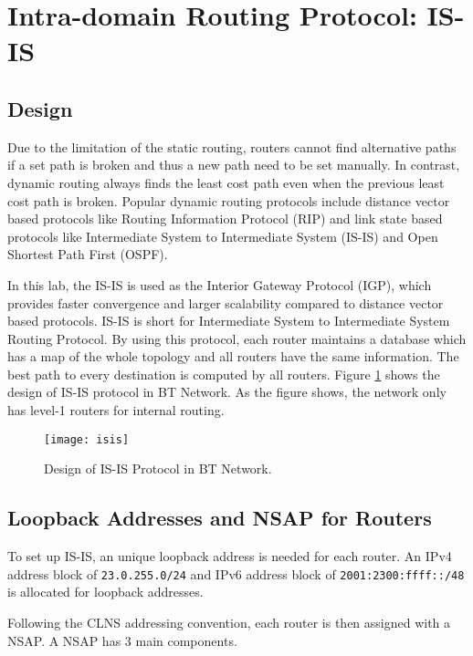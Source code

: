 \section{Intra-domain Routing Protocol: IS-IS}
\label{sec:isis}

\subsection{Design}

Due to the limitation of the static routing, routers cannot find alternative paths if a set path is broken and thus a new path need to be set manually. 
In contrast, dynamic routing always finds the least cost path even when the previous least cost path is broken.
Popular dynamic routing protocols include distance vector based protocols like Routing Information Protocol (RIP)\citep{rfc2453} and link state based protocols like Intermediate System to Intermediate System (IS-IS)\citep{rfc1142} and Open Shortest Path First (OSPF)\citep{rfc2328}. 

In this lab, the IS-IS is used as the Interior Gateway Protocol (IGP), which provides faster convergence and larger scalability compared to distance vector based protocols. 
IS-IS is short for Intermediate System to Intermediate System Routing Protocol.
By using this protocol, each router maintains a database which has a map of the whole topology and all routers have the same information. The best path to every destination is computed by all routers. 
Figure \ref{fig:isis} shows the design of IS-IS protocol in BT Network. As the figure shows, the network only has level-1 routers for internal routing.

\begin{figure}[ht!]
    \centering
    \texttt{[image: isis]}
    \caption{Design of IS-IS Protocol in BT Network.}
    \label{fig:isis}
\end{figure}

\subsection{Loopback Addresses and NSAP for Routers}

To set up IS-IS, an unique loopback address is needed for each router. 
An IPv4 address block of \texttt{23.0.255.0/24} and IPv6 address block of \texttt{2001:2300:ffff::/48} is allocated for loopback addresses. 

Following the CLNS addressing convention, each router is then assigned with a NSAP. A NSAP has $3$ main components. 


